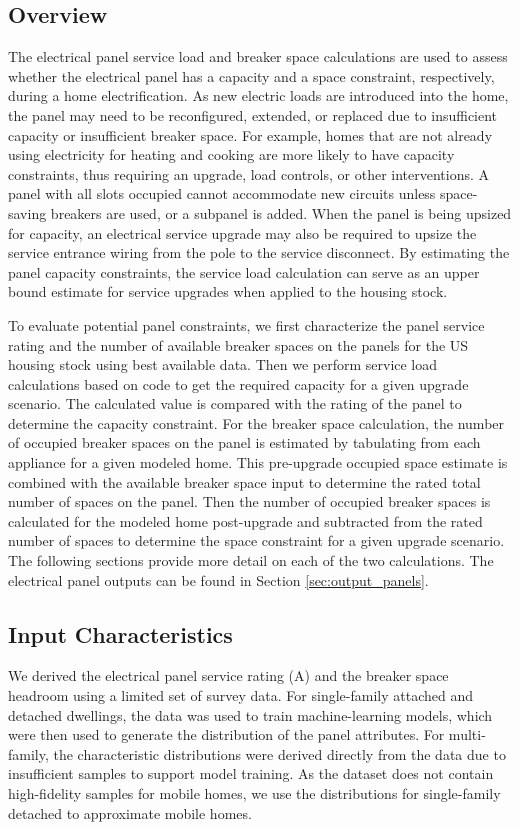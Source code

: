 \subsection{Overview}
The electrical panel service load and breaker space calculations are used to assess whether the electrical panel has a capacity and a space constraint, respectively, during a home electrification. As new electric loads are introduced into the home, the panel may need to be reconfigured, extended, or replaced due to insufficient capacity or insufficient breaker space. For example, homes that are not already using electricity for heating and cooking are more likely to have capacity constraints, thus requiring an upgrade, load controls, or other interventions. A panel with all slots occupied cannot accommodate new circuits unless space-saving breakers are used, or a subpanel is added. When the panel is being upsized for capacity, an electrical service upgrade may also be required to upsize the service entrance wiring from the pole to the service disconnect. By estimating the panel capacity constraints, the service load calculation can serve as an upper bound estimate for service upgrades when applied to the housing stock.

To evaluate potential panel constraints, we first characterize the panel service rating and the number of available breaker spaces on the panels for the US housing stock using best available data. Then we perform service load calculations based on code to get the required capacity for a given upgrade scenario. The calculated value is compared with the rating of the panel to determine the capacity constraint. For the breaker space calculation, the number of occupied breaker spaces on the panel is estimated by tabulating from each appliance for a given modeled home. This pre-upgrade occupied space estimate is combined with the available breaker space input to determine the rated total number of spaces on the panel. Then the number of occupied breaker spaces is calculated for the modeled home post-upgrade and subtracted from the rated number of spaces to determine the space constraint for a given upgrade scenario. The following sections provide more detail on each of the two calculations. The electrical panel outputs can be found in Section \ref{sec:output_panels}.

\subsection{Input Characteristics}
We derived the electrical panel service rating (A) and the breaker space headroom using a limited set of survey data. For single-family attached and detached dwellings, the data was used to train machine-learning models, which were then used to generate the distribution of the panel attributes. For multi-family, the characteristic distributions were derived directly from the data due to insufficient samples to support model training. As the dataset does not contain high-fidelity samples for mobile homes, we use the distributions for single-family detached to approximate mobile homes.


